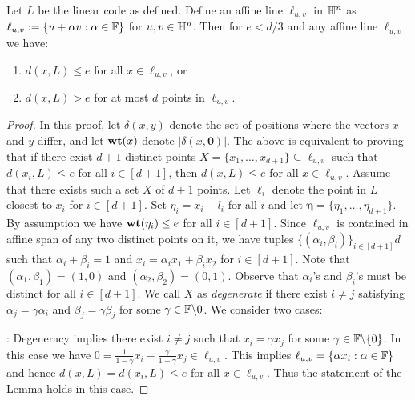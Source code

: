 \begin{lemma}\label{lem:affineline}
Let $L$ be the linear code as defined. Define an affine line $\ell_{u,v}$ in $\mathbb{H}^n$ as $\ell_{u,v} := \{u + \alpha v:\alpha\in \mathbb{F}\}$ for $u,v\in \mathbb{H}^n$. Then for $e < d/3$ and any affine line $\ell_{u,v}$ we have:
\begin{enumerate}[{\rm (i)}]
\item $d(x,L)\leq e$ for all $x\in \ell_{u,v}$, or
\item $d(x,L)> e$ for at most $d$ points in $\ell_{u,v}$.
\end{enumerate}
\end{lemma}
\begin{proof}
In this proof, let $\delta(x,y)$ denote the set of positions where the vectors
$x$ and $y$ differ, and let $\mathbf{wt}({x})$ denote $|\delta(x,\bm{0})|$. The above is equivalent to
proving that if there exist $d+1$ distinct points $X =
\{x_1,\ldots,x_{d+1}\}\subseteq \ell_{u,v}$ such
that $d(x_i,L)\leq e$ for all $i\in [d+1]$, then $d(x,L)\leq e$ for all $x\in
\ell_{u,v}$. Assume that there exists such a set $X$ of $d+1$ points. Let $\ell_i$ denote the point in $L$ closest to $x_i$ for $i\in
[d+1]$. Set $\eta_i=x_i-l_i$ for all $i$ and let
$\bm{\eta}=\{\eta_1,\ldots,\eta_{d+1}\}$. By assumption we have
$\mathbf{wt}({\eta_i})\leq e$ for all $i\in [d+1]$. Since $\ell_{u,v}$ is contained in affine
span of any two distinct points on it, we have tuples
$\{(\alpha_i,\beta_i)\}_{i\in [d+1]}d$ such that $\alpha_i + \beta_i=1$ and $x_i=\alpha_ix_1 +
\beta_ix_2$ for $i\in [d+1]$. Note that $(\alpha_1,\beta_1)=(1,0)$ and
$(\alpha_2,\beta_2)=(0,1)$. Observe that $\alpha_i$'s and $\beta_i$'s must be
distinct for all $i\in [d+1]$. We call $X$ as {\em degenerate} if there exist
$i\neq j$ satisfying $\alpha_j=\gamma\alpha_i$ and $\beta_j=\gamma\beta_j$ for
some $\gamma\in \mathbb{F}\backslash {0}$. We consider two cases:

: Degeneracy implies there exist $i\neq j$ such that $x_i=\gamma x_j$ for
some $\gamma\in \mathbb{F}\backslash\{0\}$. In this case we have $0 =
\frac{1}{1-\gamma}x_i -\frac{\gamma}{1-\gamma}x_j\in \ell_{u,v}$. This implies
$\ell_{u,v}=\{\alpha x_i: \alpha\in \mathbb{F}\}$
and hence $d(x,L)=d(x_i,L)\leq e$ for all $x\in \ell_{u,v}$. Thus the statement
of the Lemma holds in this case.\smallskip 


\end{proof}
